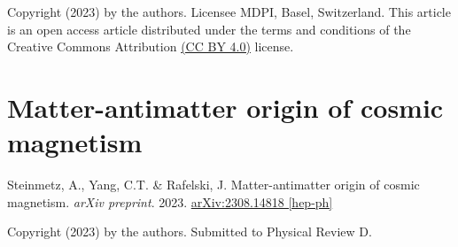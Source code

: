 \noindent Copyright (2023) by the authors. Licensee MDPI, Basel, Switzerland. This article is an open access article distributed under the terms and conditions of the Creative Commons Attribution \href{https://creativecommons.org/licenses/by/4.0/}{(CC BY 4.0)} license.

%

\chapter{Matter-antimatter origin of cosmic magnetism}
\label{appendixF}
\begin{center}
Steinmetz, A., Yang, C.T. \& Rafelski, J. Matter-antimatter origin of cosmic magnetism. \emph{arXiv preprint}. 2023. \href{https://arxiv.org/abs/2308.14818}{arXiv:2308.14818 [hep-ph]}
\end{center}

\noindent Copyright (2023) by the authors. Submitted to Physical Review D.

%
